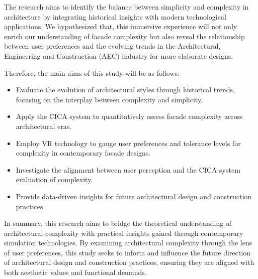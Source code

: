The research aims to identify the balance between simplicity and complexity in architecture by integrating historical insights with modern technological applications.
We hypothesized that, this immersive experience will not only enrich our understanding of facade complexity but also reveal the relationship between user preferences and the evolving trends in the Architectural, Engineering and Construction (AEC) industry for more elaborate designs.

Therefore, the main aims of this study will be as follows:

\begin{itemize}
    \item Evaluate the evolution of architectural styles through historical trends, focusing on the interplay between complexity and simplicity.
    \item Apply the CICA system to quantitatively assess facade complexity across architectural eras.
    \item Employ VR technology to gauge user preferences and tolerance levels for complexity in contemporary facade designs.
    \item Investigate the alignment between user perception and the CICA system evaluation of complexity.
    \item Provide data-driven insights for future architectural design and construction practices.
\end{itemize}

In summary, this research aims to bridge the theoretical understanding of architectural complexity with practical insights gained through contemporary simulation technologies.
By examining architectural complexity through the lens of user preferences, this study seeks to inform and influence the future direction of architectural design and construction practices, ensuring they are aligned with both aesthetic values and functional demands.



